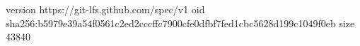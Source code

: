 version https://git-lfs.github.com/spec/v1
oid sha256:b5979e39a54f0561c2ed2cccffc7900cfe0dfbf7fed1cbc5628d199c1049f0eb
size 43840
